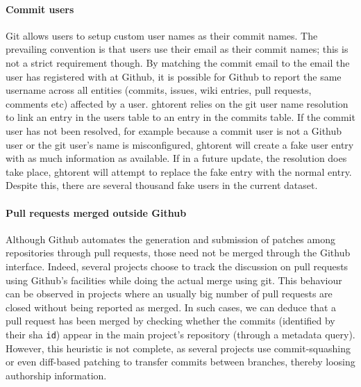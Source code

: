 \documentclass[conference]{IEEEtran}
\begin{document}
\paragraph*{Commit users} Git allows users to setup custom user names as
    their commit names. The prevailing convention is that users use their email
    as their commit names; this is not a strict requirement though. By matching
    the commit email to the email the user has registered with at Github, it is
    possible for Github to report the same username across all entities
    (commits, issues, wiki entries, pull requests, comments etc) affected by a
    user. {\sc ght}orent relies on the git user name resolution to link an entry in
    the \textsf{users} table to an entry in the \textsf{commits} table. If the
    commit user has not been resolved, for example because a commit user is not
    a Github user or the git user's name is misconfigured, {\sc ght}orent will create
    a fake user entry with as much information as available. If in a future
    update, the resolution does take place, {\sc ght}orent will attempt to replace
    the fake entry with the normal entry. Despite this, there are several
    thousand fake users in the current dataset.
    
\paragraph*{Pull requests merged outside Github} Although Github
    automates the generation and submission of patches among repositories
    through pull requests, those need not be merged through the Github
    interface. Indeed, several projects choose to track the discussion on pull
    requests using Github's facilities while doing the actual merge using
    {\sf git}. This behaviour can be observed in projects where an usually big
    number of pull requests are closed without being reported as merged.
    In such cases, we can deduce that a pull request has been merged by checking
    whether the commits (identified by their {\sc sha} \texttt{id}) appear in 
    the main project's repository (through a metadata query). However, this
    heuristic is not complete, as several projects use commit-squashing or
    even diff-based patching to transfer commits between branches, thereby
    loosing authorship information.

\end{document}
